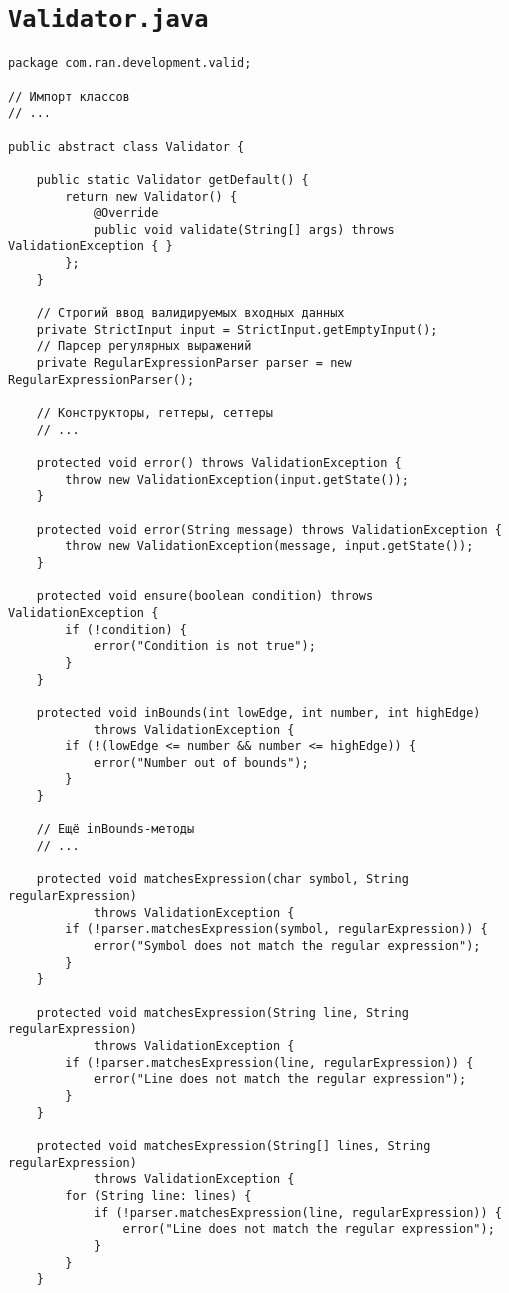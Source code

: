 \section*{\texttt{Validator.java}}
\begin{verbatim}
package com.ran.development.valid;

// Импорт классов
// ...

public abstract class Validator {

    public static Validator getDefault() {
        return new Validator() {
            @Override
            public void validate(String[] args) throws ValidationException { }
        };
    }
    
    // Строгий ввод валидируемых входных данных
    private StrictInput input = StrictInput.getEmptyInput();
    // Парсер регулярных выражений
    private RegularExpressionParser parser = new RegularExpressionParser();

    // Конструкторы, геттеры, сеттеры
    // ...
    
    protected void error() throws ValidationException {
        throw new ValidationException(input.getState());
    }
    
    protected void error(String message) throws ValidationException {
        throw new ValidationException(message, input.getState());
    }
    
    protected void ensure(boolean condition) throws ValidationException {
        if (!condition) {
            error("Condition is not true");
        }
    }
    
    protected void inBounds(int lowEdge, int number, int highEdge)
            throws ValidationException {
        if (!(lowEdge <= number && number <= highEdge)) {
            error("Number out of bounds");
        }
    }
    
    // Ещё inBounds-методы
    // ...
    
    protected void matchesExpression(char symbol, String regularExpression)
            throws ValidationException {
        if (!parser.matchesExpression(symbol, regularExpression)) {
            error("Symbol does not match the regular expression");
        }
    }
    
    protected void matchesExpression(String line, String regularExpression)
            throws ValidationException {
        if (!parser.matchesExpression(line, regularExpression)) {
            error("Line does not match the regular expression");
        }
    }
    
    protected void matchesExpression(String[] lines, String regularExpression)
            throws ValidationException {
        for (String line: lines) {
            if (!parser.matchesExpression(line, regularExpression)) {
                error("Line does not match the regular expression");
            }
        }
    }
    

\end{verbatim}
